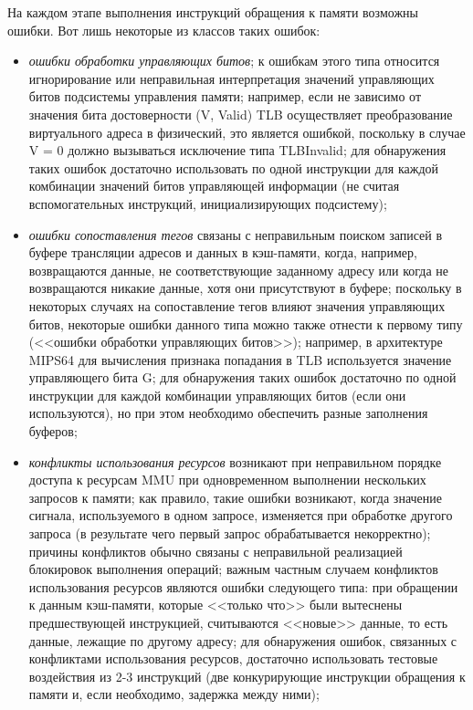 На каждом этапе выполнения инструкций обращения к памяти возможны ошибки. Вот лишь некоторые из классов таких ошибок:
\begin{itemize}
  \item \emph{ошибки обработки управляющих битов}; к ошибкам этого типа относится игнорирование или неправильная интерпретация значений управляющих битов подсистемы управления памяти; например, если не зависимо от значения бита достоверности (V, Valid) TLB осуществляет преобразование виртуального адреса в физический, это является ошибкой, поскольку в случае V = 0 должно вызываться исключение типа TLBInvalid; для обнаружения таких ошибок достаточно использовать по одной инструкции для каждой комбинации значений битов управляющей информации (не считая вспомогательных инструкций, инициализирующих подсистему);
  \item \emph{ошибки сопоставления тегов} связаны с неправильным поиском записей в буфере трансляции адресов и данных в кэш-памяти, когда, например, возвращаются данные, не соответствующие заданному адресу или когда не возвращаются никакие данные, хотя они присутствуют в буфере; поскольку в некоторых случаях на сопоставление тегов влияют значения управляющих битов, некоторые ошибки данного типа можно также отнести к первому типу (<<ошибки обработки управляющих битов>>); например, в архитектуре MIPS64 для вычисления признака попадания в TLB используется значение управляющего бита G; для обнаружения таких ошибок достаточно по одной инструкции для каждой комбинации управляющих битов (если они используются), но при этом необходимо обеспечить разные заполнения буферов;
  \item \emph{конфликты использования ресурсов} возникают при неправильном порядке доступа к ресурсам MMU при одновременном выполнении нескольких запросов к памяти; как правило, такие ошибки возникают, когда значение сигнала, используемого в одном запросе, изменяется при обработке другого запроса (в результате чего первый запрос обрабатывается некорректно); причины конфликтов обычно связаны с неправильной реализацией блокировок выполнения операций; важным частным случаем конфликтов использования ресурсов являются ошибки следующего типа: при обращении к данным кэш-памяти, которые <<только что>> были вытеснены предшествующей инструкцией, считываются <<новые>> данные, то есть данные, лежащие по другому адресу; для обнаружения ошибок, связанных с конфликтами использования ресурсов, достаточно использовать тестовые воздействия из 2-3 инструкций (две конкурирующие инструкции обращения к памяти и, если необходимо, задержка между ними);

\end{itemize}
